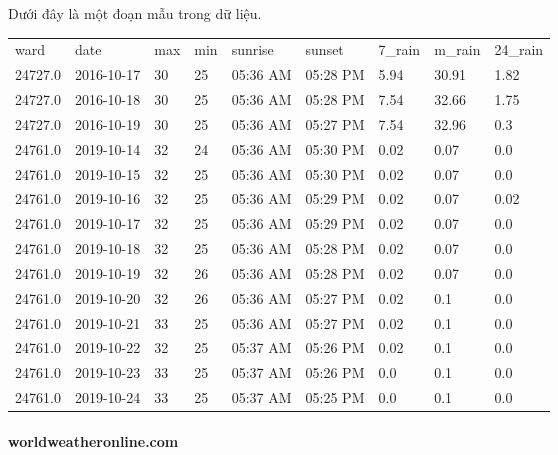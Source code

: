 \documentclass{article}
\begin{document}
Dưới đây là một đoạn mẫu trong dữ liệu.

\begin{table}[H]
      \begin{tabular}{lllllllll}
            ward    & date       & max & min & sunrise  & sunset   & 7\_rain & m\_rain & 24\_rain \\
            24727.0 & 2016-10-17 & 30  & 25  & 05:36 AM & 05:28 PM & 5.94    & 30.91   & 1.82     \\
            24727.0 & 2016-10-18 & 30  & 25  & 05:36 AM & 05:28 PM & 7.54    & 32.66   & 1.75     \\
            24727.0 & 2016-10-19 & 30  & 25  & 05:36 AM & 05:27 PM & 7.54    & 32.96   & 0.3      \\
            24761.0 & 2019-10-14 & 32  & 24  & 05:36 AM & 05:30 PM & 0.02    & 0.07    & 0.0      \\
            24761.0 & 2019-10-15 & 32  & 25  & 05:36 AM & 05:30 PM & 0.02    & 0.07    & 0.0      \\
            24761.0 & 2019-10-16 & 32  & 25  & 05:36 AM & 05:29 PM & 0.02    & 0.07    & 0.02     \\
            24761.0 & 2019-10-17 & 32  & 25  & 05:36 AM & 05:29 PM & 0.02    & 0.07    & 0.0      \\
            24761.0 & 2019-10-18 & 32  & 25  & 05:36 AM & 05:28 PM & 0.02    & 0.07    & 0.0      \\
            24761.0 & 2019-10-19 & 32  & 26  & 05:36 AM & 05:28 PM & 0.02    & 0.07    & 0.0      \\
            24761.0 & 2019-10-20 & 32  & 26  & 05:36 AM & 05:27 PM & 0.02    & 0.1     & 0.0      \\
            24761.0 & 2019-10-21 & 33  & 25  & 05:36 AM & 05:27 PM & 0.02    & 0.1     & 0.0      \\
            24761.0 & 2019-10-22 & 32  & 25  & 05:37 AM & 05:26 PM & 0.02    & 0.1     & 0.0      \\
            24761.0 & 2019-10-23 & 33  & 25  & 05:37 AM & 05:26 PM & 0.0     & 0.1     & 0.0      \\
            24761.0 & 2019-10-24 & 33  & 25  & 05:37 AM & 05:25 PM & 0.0     & 0.1     & 0.0
      \end{tabular}
\end{table}

\paragraph{worldweatheronline.com}
\end{document}
